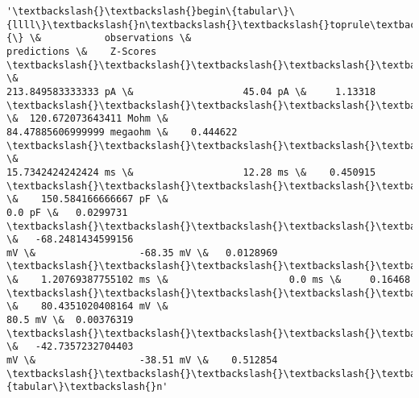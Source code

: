         
            \begin{tcolorbox}[breakable, size=fbox, boxrule=.5pt, pad at break*=1mm, opacityfill=0]
\begin{Verbatim}[commandchars=\\\{\}]
'\textbackslash{}\textbackslash{}begin\{tabular\}\{llll\}\textbackslash{}n\textbackslash{}\textbackslash{}toprule\textbackslash{}n\{\} \&           observations \&
predictions \&    Z-Scores \textbackslash{}\textbackslash{}\textbackslash{}\textbackslash{}\textbackslash{}n\textbackslash{}\textbackslash{}midrule\textbackslash{}nRheobaseTest                   \&
213.849583333333 pA \&                   45.04 pA \&     1.13318
\textbackslash{}\textbackslash{}\textbackslash{}\textbackslash{}\textbackslash{}nInputResistanceTest            \&  120.672073643411 Mohm \&
84.47885606999999 megaohm \&    0.444622 \textbackslash{}\textbackslash{}\textbackslash{}\textbackslash{}\textbackslash{}nTimeConstantTest               \&
15.7342424242424 ms \&                   12.28 ms \&    0.450915
\textbackslash{}\textbackslash{}\textbackslash{}\textbackslash{}\textbackslash{}nCapacitanceTest                \&    150.584166666667 pF \&
0.0 pF \&   0.0299731 \textbackslash{}\textbackslash{}\textbackslash{}\textbackslash{}\textbackslash{}nRestingPotentialTest           \&   -68.2481434599156
mV \&                  -68.35 mV \&   0.0128969 \textbackslash{}\textbackslash{}\textbackslash{}\textbackslash{}\textbackslash{}nInjectedCurrentAPWidthTest
\&    1.20769387755102 ms \&                     0.0 ms \&     0.16468
\textbackslash{}\textbackslash{}\textbackslash{}\textbackslash{}\textbackslash{}nInjectedCurrentAPAmplitudeTest \&    80.4351020408164 mV \&
80.5 mV \&  0.00376319 \textbackslash{}\textbackslash{}\textbackslash{}\textbackslash{}\textbackslash{}nInjectedCurrentAPThresholdTest \&   -42.7357232704403
mV \&                  -38.51 mV \&    0.512854
\textbackslash{}\textbackslash{}\textbackslash{}\textbackslash{}\textbackslash{}n\textbackslash{}\textbackslash{}bottomrule\textbackslash{}n\textbackslash{}\textbackslash{}end\{tabular\}\textbackslash{}n'
\end{Verbatim}
\end{tcolorbox}
        
    

    
    \begin{center}
    \end{center}
    { \hspace*{\fill} \\}
    
